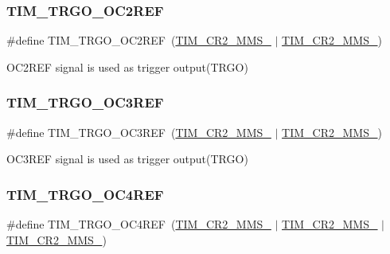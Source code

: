\subsubsection{\texorpdfstring{T\+I\+M\+\_\+\+T\+R\+G\+O\+\_\+\+O\+C2\+R\+EF}{TIM\_TRGO\_OC2REF}}
{\footnotesize\ttfamily \#define T\+I\+M\+\_\+\+T\+R\+G\+O\+\_\+\+O\+C2\+R\+EF~(\hyperlink{group___peripheral___registers___bits___definition_gacb74a815afdd856d51cfcf1ddf3fce6a}{T\+I\+M\+\_\+\+C\+R2\+\_\+\+M\+M\+S\+\_} $\vert$ \hyperlink{group___peripheral___registers___bits___definition_gaf3e55308e84106d6501201e66bd46ab6}{T\+I\+M\+\_\+\+C\+R2\+\_\+\+M\+M\+S\+\_})}

O\+C2\+R\+EF signal is used as trigger output(\+T\+R\+G\+O) \mbox{\label{group___t_i_m___master___mode___selection_ga4bc4791f8b9560950d30078b96d08f55}} 
\subsubsection{\texorpdfstring{T\+I\+M\+\_\+\+T\+R\+G\+O\+\_\+\+O\+C3\+R\+EF}{TIM\_TRGO\_OC3REF}}
{\footnotesize\ttfamily \#define T\+I\+M\+\_\+\+T\+R\+G\+O\+\_\+\+O\+C3\+R\+EF~(\hyperlink{group___peripheral___registers___bits___definition_gacb74a815afdd856d51cfcf1ddf3fce6a}{T\+I\+M\+\_\+\+C\+R2\+\_\+\+M\+M\+S\+\_} $\vert$ \hyperlink{group___peripheral___registers___bits___definition_ga4b1036929b0a4ba5bd5cced9b8e0f4c3}{T\+I\+M\+\_\+\+C\+R2\+\_\+\+M\+M\+S\+\_})}

O\+C3\+R\+EF signal is used as trigger output(\+T\+R\+G\+O) \mbox{\label{group___t_i_m___master___mode___selection_ga7fe6228adec5d1b6f0a8ed8da111db4d}} 
\subsubsection{\texorpdfstring{T\+I\+M\+\_\+\+T\+R\+G\+O\+\_\+\+O\+C4\+R\+EF}{TIM\_TRGO\_OC4REF}}
{\footnotesize\ttfamily \#define T\+I\+M\+\_\+\+T\+R\+G\+O\+\_\+\+O\+C4\+R\+EF~(\hyperlink{group___peripheral___registers___bits___definition_gacb74a815afdd856d51cfcf1ddf3fce6a}{T\+I\+M\+\_\+\+C\+R2\+\_\+\+M\+M\+S\+\_} $\vert$ \hyperlink{group___peripheral___registers___bits___definition_ga4b1036929b0a4ba5bd5cced9b8e0f4c3}{T\+I\+M\+\_\+\+C\+R2\+\_\+\+M\+M\+S\+\_} $\vert$ \hyperlink{group___peripheral___registers___bits___definition_gaf3e55308e84106d6501201e66bd46ab6}{T\+I\+M\+\_\+\+C\+R2\+\_\+\+M\+M\+S\+\_})}

